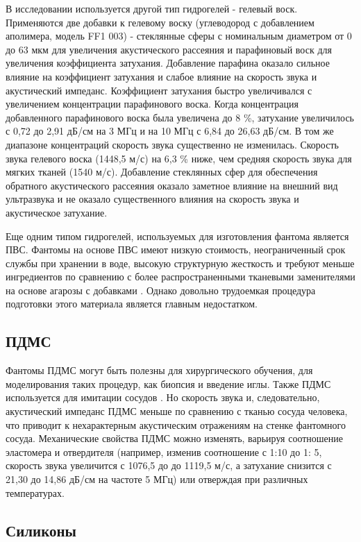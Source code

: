В исследовании \cite{litlink53} используется другой тип гидрогелей - гелевый воск. Применяются две добавки к гелевому воску (углеводород с добавлением аполимера, модель FF1 003) - стеклянные сферы с номинальным диаметром от 0 до 63 мкм для увеличения акустического рассеяния и парафиновый воск для увеличения коэффициента затухания. Добавление парафина оказало сильное влияние на коэффициент затухания и слабое влияние на скорость звука и акустический импеданс. Коэффициент затухания быстро увеличивался с увеличением концентрации парафинового воска. Когда концентрация добавленного парафинового воска была увеличена до 8 \%, затухание увеличилось с 0,72 до 2,91 дБ/см на 3 МГц и на 10 МГц с 6,84 до 26,63 дБ/см. В том же диапазоне концентраций скорость звука существенно не изменилась. Скорость звука гелевого воска (1448,5 м/с) на 6,3 \% ниже, чем средняя скорость звука для мягких тканей (1540 м/с). Добавление стеклянных сфер для обеспечения обратного акустического рассеяния оказало заметное влияние на внешний вид ультразвука и не оказало существенного влияния на скорость звука и акустическое затухание.

Еще одним типом гидрогелей, используемых для изготовления фантома является ПВС. Фантомы на основе ПВС имеют низкую стоимость, неограниченный срок службы при хранении в воде, высокую структурную жесткость и требуют меньше ингредиентов по сравнению с более распространенными тканевыми заменителями на основе агарозы с добавками \cite{litlink54}. Однако довольно трудоемкая процедура подготовки этого материала является главным недостатком.

\subsection{ПДМС}

Фантомы ПДМС могут быть полезны для хирургического обучения, для моделирования таких процедур, как биопсия и введение иглы. Также ПДМС используется для имитации сосудов \cite{litlink54}. Но скорость звука и, следовательно, акустический импеданс ПДМС меньше по сравнению с тканью сосуда человека, что приводит к нехарактерным акустическим отражениям на стенке фантомного сосуда. Механические свойства ПДМС можно изменять, варьируя соотношение эластомера и отвердителя (например, изменив соотношение с 1:10 до 1: 5, скорость звука увеличится с 1076,5 до до 1119,5 м/с, а затухание снизится с 21,30 до 14,86 дБ/см на частоте 5 МГц) \cite{litlink55} или отверждая при различных температурах. 

\subsection{Силиконы}

